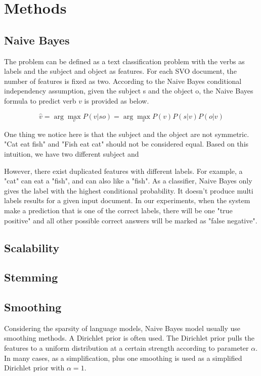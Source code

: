 \section{Methods}

\subsection{Naive Bayes}

The problem can be defined as a text classification problem with the verbs as labels and the subject and object as features. For each SVO document, the number of features is fixed as two. According to the Naive Bayes conditional independency assumption, given the subject s and the object o, the Naive Bayes formula to predict verb $v$ is provided as below.

\begin{equation}
	\hat{v} = \arg\max_v P(v|so) = \arg\max_v P(v)P(s|v)P(o|v)
\end{equation}

One thing we notice here is that the subject and the object are not symmetric. "Cat eat fish" and "Fish eat cat" should not be considered equal. Based on this intuition, we have two different subject and 

However, there exist duplicated features with different labels. For example, a "cat" can eat a "fish", and can also like a "fish". As a classifier, Naive Bayes only gives the label with the highest conditional probability. It doesn't produce multi labels results for a given input document. In our experiments, when the system make a prediction that is one of the correct labels, there will be one "true positive" and all other possible correct answers will be marked as "false negative".

\subsection{Scalability}


\subsection{Stemming}

\subsection{Smoothing}

Considering the sparsity of language models, Naive Bayes model usually use smoothing methods. A Dirichlet prior is often used. The Dirichlet prior pulls the features to a uniform distribution at a certain strength according to parameter $\alpha$. In many cases, as a simplification, plus one smoothing is used as a simplified Dirichlet prior with $\alpha=1$.

